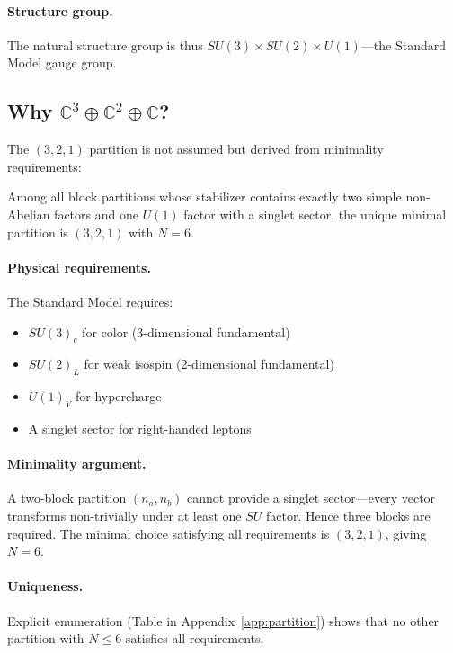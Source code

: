 \paragraph{Structure group.}
The natural structure group is thus $SU(3) \times SU(2) \times U(1)$---the Standard Model gauge group.

\subsection{Why $\mathbb{C}^3 \oplus \mathbb{C}^2 \oplus \mathbb{C}$?}\label{sec:quantum-partition}

The $(3,2,1)$ partition is not assumed but derived from minimality requirements:

\begin{proposition}
Among all block partitions whose stabilizer contains exactly two simple non-Abelian factors and one $U(1)$ factor with a singlet sector, the unique minimal partition is $(3,2,1)$ with $N = 6$.
\end{proposition}

\paragraph{Physical requirements.}
The Standard Model requires:
\begin{itemize}
\item $SU(3)_c$ for color (3-dimensional fundamental)
\item $SU(2)_L$ for weak isospin (2-dimensional fundamental)
\item $U(1)_Y$ for hypercharge
\item A singlet sector for right-handed leptons
\end{itemize}

\paragraph{Minimality argument.}
A two-block partition $(n_a, n_b)$ cannot provide a singlet sector---every vector transforms non-trivially under at least one $SU$ factor. Hence three blocks are required. The minimal choice satisfying all requirements is $(3,2,1)$, giving $N = 6$.

\paragraph{Uniqueness.}
Explicit enumeration (Table in Appendix~\ref{app:partition}) shows that no other partition with $N \leq 6$ satisfies all requirements.

